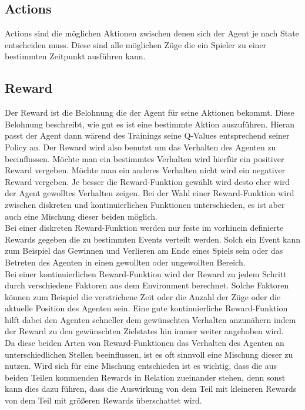 \subsection{Actions}
Actions sind die möglichen Aktionen zwischen denen sich der Agent je nach State entscheiden muss. Diese sind alle möglichen Züge die ein Spieler zu einer bestimmten Zeitpunkt ausführen kann.

\subsection{Reward}
Der Reward ist die Belohnung die der Agent für seine Aktionen bekommt. Diese Belohnung beschreibt, wie gut es ist eine bestimmte Aktion auszuführen. Hieran passt der Agent dann wärend des Trainings seine Q-Values entsprechend seiner Policy an. Der Reward wird also benutzt um das Verhalten des Agenten zu beeinflussen. Möchte man ein bestimmtes Verhalten wird hierfür ein positiver Reward vergeben. Möchte man ein anderes Verhalten nicht wird ein negativer Reward vergeben. Je besser die  Reward-Funktion gewählt wird desto eher wird der Agent gewolltes Verhalten zeigen. Bei der Wahl einer Reward-Funktion wird zwischen diskreten und  kontinuierlichen Funktionen unterschieden, es ist aber auch eine Mischung dieser beiden möglich.\\
Bei einer diskreten Reward-Funktion werden nur feste im vorhinein definierte Rewards gegeben die zu bestimmten Events verteilt werden. Solch ein Event kann zum Beispiel das Gewinnen und Verlieren am Ende eines Spiels sein oder das Betreten des Agenten in einen gewollten oder ungewollten Bereich. \\
Bei einer kontinuierlichen Reward-Funktion wird der Reward zu jedem Schritt durch verschiedene Faktoren aus dem Environment berechnet. Solche Faktoren können zum Beispiel die verstrichene Zeit oder die Anzahl der Züge oder die aktuelle Position des Agenten sein. Eine gute kontinuierliche Reward-Funktion hilft dabei den Agenten schneller dem gewünschten Verhalten anzunähern indem der Reward zu den gewünschten Zielstates hin immer weiter angehoben wird.\\ 
Da diese beiden Arten von Reward-Funktionen das Verhalten des Agenten an unterschiedlichen Stellen beeinflussen, ist es oft sinnvoll eine Mischung dieser zu nutzen.
Wird sich für eine Mischung entschieden ist es wichtig, dass die aus beiden Teilen kommenden Rewards in Relation zueinander stehen, denn sonst kann dies dazu führen, dass die Auswirkung von dem Teil mit kleineren Rewards von dem Teil mit größeren Rewards überschattet wird.\\

